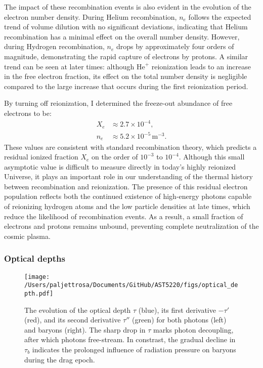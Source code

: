 \documentclass{aa}
\numberwithin{equation}{section}
\numberwithin{table}{section}
\numberwithin{figure}{section}
\begin{document}
The impact of these recombination events is also evident in the evolution of the electron number density. During Helium recombination, $n_e$ follows the expected trend of volume dilution with no significant deviations, indicating that Helium recombination has a minimal effect on the overall number density. However, during Hydrogen recombination, $n_e$ drops by approximately four orders of magnitude, demonstrating the rapid capture of electrons by protons. A similar trend can be seen at later times: although $\text{He}^{+}$ reionization leads to an increase in the free electron fraction, its effect on the total number density is negligible compared to the large increase that occurs during the first reionization period.

By turning off reionization, I determined the freeze-out abundance of free electrons to be:
\begin{align*}
  X_e &\approx 2.7 \times10^{-4},
  \\
  n_e &\approx 5.2 \times10^{-5}\,\text{m}^{-3}.
\end{align*}
These values are consistent with standard recombination theory, which predicts a residual ionized fraction $X_e$ on the order of $10^{-3}$ to $10^{-4}$. Although this small asymptotic value is difficult to measure directly in today's highly reionized Universe, it plays an important role in our understanding of the thermal history between recombination and reionization. The presence of this residual electron population reflects both the continued existence of high-energy photons capable of reionizing hydrogen atoms and the low particle densities at late times, which reduce the likelihood of recombination events. As a result, a small fraction of electrons and protons remains unbound, preventing complete neutralization of the cosmic plasma.



\subsubsection{Optical depths}

\begin{figure*}
  \centering
  \texttt{[image: /Users/paljettrosa/Documents/GitHub/AST5220/figs/optical\_depth.pdf]}
  \caption{The evolution of the optical depth $\tau$ (blue), its first derivative $-\tau'$ (red), and its second derivative $\tau''$ (green) for both photons (left) and baryons (right). 
  The sharp drop in $\tau$ marks photon decoupling, after which photons free-stream. In constrast, the gradual decline in $\tau_b$ indicates the prolonged influence of radiation pressure on baryons during the drag epoch. 
  }\label{fig:optical depth}
\end{figure*}
\end{document}
